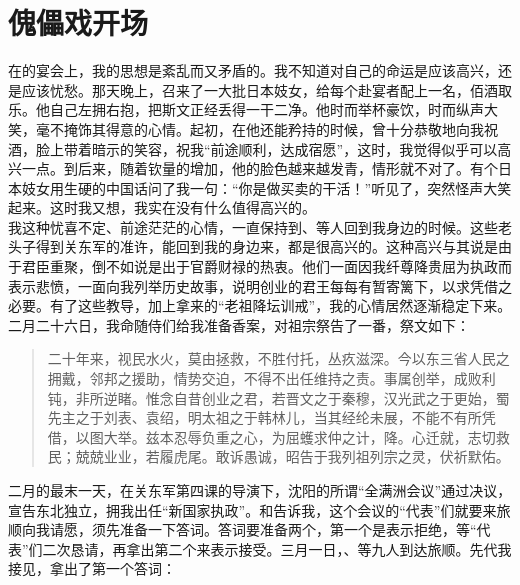 \fancyhead[RO]{} %
\fancyhead[LE]{} %
\chapter*{傀儡戏开场}
\thispagestyle{empty}
  在的宴会上，我的思想是紊乱而又矛盾的。我不知道对自己的命运是应该高兴，还是应该忧愁。那天晚上，召来了一大批日本妓女，给每个赴宴者配上一名，佰酒取乐。他自己左拥右抱，把斯文正经丢得一干二净。他时而举杯豪饮，时而纵声大笑，毫不掩饰其得意的心情。起初，在他还能矜持的时候，曾十分恭敬地向我祝酒，脸上带着暗示的笑容，祝我“前途顺利，达成宿愿”，这时，我觉得似乎可以高兴一点。到后来，随着钦量的增加，他的脸色越来越发青，情形就不对了。有个日本妓女用生硬的中国话问了我一句：“你是做买卖的干活！”听见了，突然怪声大笑起来。这时我又想，我实在没有什么值得高兴的。\\

我这种忧喜不定、前途茫茫的心情，一直保持到、等人回到我身边的时候。这些老头子得到关东军的准许，能回到我的身边来，都是很高兴的。这种高兴与其说是由于君臣重聚，倒不如说是出于官爵财禄的热衷。他们一面因我纤尊降贵屈为执政而表示悲愤，一面向我列举历史故事，说明创业的君王每每有暂寄篱下，以求凭借之必要。有了这些教导，加上拿来的“老祖降坛训戒”，我的心情居然逐渐稳定下来。二月二十六日，我命随侍们给我准备香案，对祖宗祭告了一番，祭文如下：\\

\begin{quote}
	二十年来，视民水火，莫由拯救，不胜付托，丛疚滋深。今以东三省人民之拥戴，邻邦之援助，情势交迫，不得不出任维持之责。事属创举，成败利钝，非所逆睹。惟念自昔创业之君，若晋文之于秦穆，汉光武之于更始，蜀先主之于刘表、袁绍，明太祖之于韩林儿，当其经纶未展，不能不有所凭借，以图大举。兹本忍辱负重之心，为屈蠖求仲之计，降。心迁就，志切救民；兢兢业业，若履虎尾。敢诉愚诚，昭告于我列祖列宗之灵，伏祈默佑。\\
\end{quote}

二月的最末一天，在关东军第四课的导演下，沈阳的所谓“全满洲会议”通过决议，宣告东北独立，拥我出任“新国家执政”。和告诉我，这个会议的“代表”们就要来旅顺向我请愿，须先准备一下答词。答词要准备两个，第一个是表示拒绝，等“代表”们二次恳请，再拿出第二个来表示接受。三月一日，、等九人到达旅顺。先代我接见，拿出了第一个答词：\\

